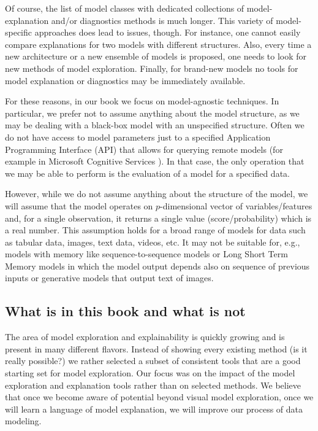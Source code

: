 \documentclass[12pt,]{krantz}
\begin{document}
Of course, the list of model classes with dedicated collections of model-explanation and/or diagnostics methods is much longer. This variety of model-specific approaches does lead to issues, though. For instance, one cannot easily compare explanations for two models with different structures. Also, every time a new architecture or a new ensemble of models is proposed, one needs to look for new methods of model exploration. Finally, for brand-new models no tools for model explanation or diagnostics may be immediately available.

For these reasons, in our book we focus on model-agnostic techniques. In particular, we prefer not to assume anything about the model structure, as we may be dealing with a black-box model with an unspecified structure. Often we do not have access to model parameters just to a specified Application Programming Interface (API) that allows for querying remote models (for example in Microsoft Cognitive Services \citep{MicrosofrCognitiveServices}).
In that case, the only operation that we may be able to perform is the evaluation of a model for a specified data.

However, while we do not assume anything about the structure of the model, we will assume that the model operates on \(p\)-dimensional vector of variables/features and, for a single observation, it returns a single value (score/probability) which is a real number. This assumption holds for a broad range of models for data such as tabular data, images, text data, videos, etc. It may not be suitable for, e.g., models with memory like sequence-to-sequence models \citep{seq2seq} or Long Short Term Memory models \citep{lstm} in which the model output depends also on sequence of previous inputs or generative models that output text of images.

\hypertarget{what-is-in-this-book-and-what-is-not}{%
\subsection{What is in this book and what is not}\label{what-is-in-this-book-and-what-is-not}}

The area of model exploration and explainability is quickly growing and is present in many different flavors. Instead of showing every existing method (is it really possible?) we rather selected a subset of consistent tools that are a good starting set for model exploration. Our focus was on the impact of the model exploration and explanation tools rather than on selected methods. We believe that once we become aware of potential beyond visual model exploration, once we will learn a language of model explanation, we will improve our process of data modeling.
\end{document}
